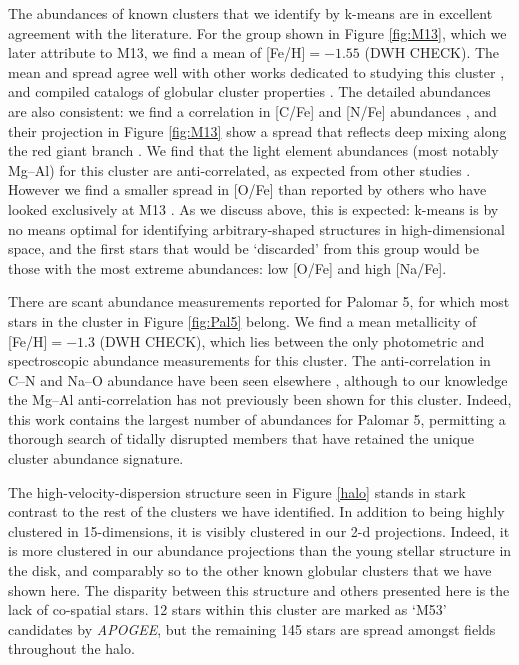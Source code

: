 \documentclass[12pt, letterpaper, preprint]{aastex}
\newcommand{\acronym}[1]{{\small{#1}}}
\newcommand{\project}[1]{\textsl{#1}}
\newcommand{\apogee}{\project{\acronym{APOGEE}}}
\begin{document}
The abundances of known clusters that we identify by k-means are in
excellent agreement with the literature. For the group shown in Figure \ref{fig:M13},
which we later attribute to M13, we find a mean of [Fe/H]$ = -1.55$ (DWH CHECK).
The mean and spread agree well with other works dedicated to studying this cluster
\citep{Kraft_1992,Cohen_Melendez_2005,Johnson_Pilachowski_2012}, and compiled catalogs of
globular cluster properties \citep[][accessed 2016]{Harris_1996}. The detailed abundances are also
consistent: we find a correlation in [C/Fe] and [N/Fe] abundances \citep{Smith_2005}, and their
projection in Figure \ref{fig:M13} show a spread that reflects deep mixing
along the red giant branch \citep{Briley_2004}. We find that the light element
abundances (most notably Mg--Al) for this cluster are anti-correlated, as
expected from other studies \citep[e.g.,][]{gratton}. However we find a
smaller spread in [O/Fe] than reported by others who have looked exclusively
at M13 \citep{Johnson_Pilachowski_2012}.  As we discuss above, this is expected:
k-means is by no means optimal for identifying arbitrary-shaped structures
in high-dimensional space, and the first stars that would be `discarded' from
this group would be those with the most extreme abundances: low [O/Fe] and
high [Na/Fe].


There are scant abundance measurements reported for Palomar 5, for which
most stars in the cluster in Figure \ref{fig:Pal5} belong. We find a mean
metallicity of [Fe/H]$ = -1.3$ (DWH CHECK), which lies between the only
photometric \citep{Geisler_1997} and spectroscopic \citep{Smith_1985,Smith_2002} abundance
measurements for this cluster.  The anti-correlation in C--N and Na--O abundance
have been seen elsewhere \citep[][respectively]{Smith_1985,Smith_2002}, although
to our knowledge the Mg--Al anti-correlation has not previously been shown for this cluster.
Indeed, this work contains the largest number of abundances for Palomar 5,
permitting a thorough search of tidally disrupted members \citep[e.g.,][]{Kuzma_2015} 
that have retained the unique cluster abundance signature.






The high-velocity-dispersion structure seen in Figure \ref{halo} stands
in stark contrast to the rest of the clusters we have identified. In
addition to being highly clustered in 15-dimensions, it is visibly
clustered in our 2-d projections. Indeed, it is more clustered in our
abundance projections than the young stellar structure in the disk,
and comparably so to the other known globular clusters that we have
shown here. The disparity between this structure and others presented
here is the lack of co-spatial stars. 12 stars within this cluster are
marked as `M53' candidates by \apogee, but the remaining 145 stars
are spread amongst fields throughout the halo.  
\end{document}
